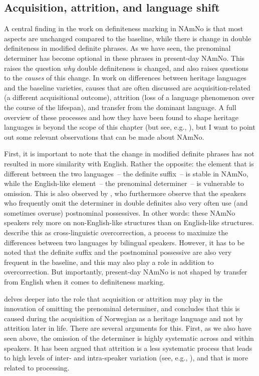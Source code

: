 \documentclass[output=paper]{langscibook}
\begin{document}
\subsection{Acquisition, attrition, and language shift} \label{Factors}
A central finding in the work on definiteness marking in NAmNo is that most aspects are unchanged compared to the baseline, while there is change in double definiteness in modified definite phrases. As we have seen, the prenominal determiner has become optional in these phrases in present-day NAmNo. This raises the question \textit{why} double definiteness is changed, and also raises questions to the \textit{causes} of this change. In work on differences between heritage languages and the baseline varieties, causes that are often discussed are acquisition-related (a different acquisitional outcome), attrition (loss of a language phenomenon over the course of the lifespan), and transfer from the dominant language. A full overview of these processes and how they have been found to shape heritage languages is beyond the scope of this chapter (but see, e.g., \citealt{BenmamoumEtAl2013, Polinsky2018, ScontrasEtAl2015}), but I want to point out some relevant observations that can be made about NAmNo.
 
First, it is important to note that the change in modified definite phrases has not resulted in more similarity with English. Rather the opposite: the element that is different between the two languages~-- the definite suffix~-- is stable in NAmNo, while the English-like element~-- the prenominal determiner~-- is vulnerable to omission. This is also observed by \citet{ALW2018}, who furthermore observe that the speakers who frequently omit the determiner in double definites also very often use (and sometimes overuse) postnominal possessives. In other words: these NAmNo speakers rely more on non-English-like structures than on English-like structures. \citet{ALW2018} describe this as cross-linguistic overcorrection, a process to maximize the differences between two languages by bilingual speakers. However, it has to be noted that the definite suffix and the postnominal possessive are also very frequent in the baseline, and this may also play a role in addition to overcorrection. But importantly, present-day NAmNo is not shaped by transfer from English when it comes to definiteness marking.

 delves deeper into the role that acquisition or attrition may play in the innovation of omitting the prenominal determiner, and concludes that this is caused during the acquisition of Norwegian as a heritage language and not by attrition later in life. There are several arguments for this. First, as we also have seen above, the omission of the determiner is highly systematic across and within speakers. It has been argued that attrition is a less systematic process that leads to high levels of inter- and intra\hyp speaker variation (see, e.g., \citealt{LohndalWestergaard2016, Kinn2020, PerezCortesEtAl2019, PutnamSanchez2013}), and that is more related to processing.
 
\end{document}
